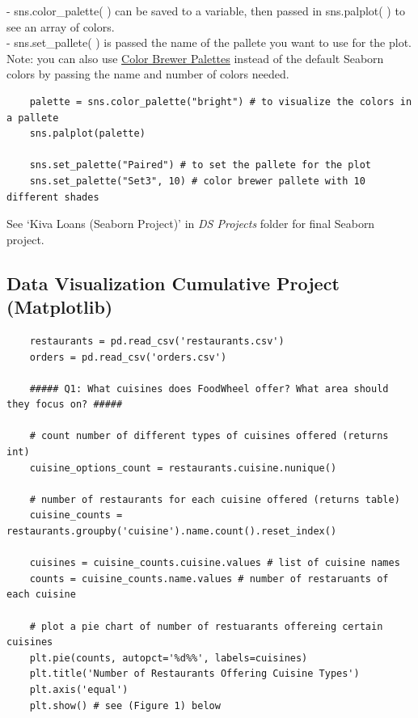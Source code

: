 \documentclass[11pt, a4paper]{article}
\begin{document}
\begin{spacing}{1.1}
	\hspace*{3mm} - sns.color\_palette( ) can be saved to a variable, then passed in sns.palplot( ) to see an array of colors. \\
	\hspace*{3mm} - sns.set\_pallete( ) is passed the name of the pallete you want to use for the plot. \vspace*{2mm} \\
	Note: you can also use \href{https://colorbrewer2.org/#type=sequential&scheme=BuGn&n=3}{Color Brewer Palettes} instead of the default Seaborn colors by passing the name and number of colors needed.
	\begin{lstlisting}
	palette = sns.color_palette("bright") # to visualize the colors in a pallete
	sns.palplot(palette) 
	
	sns.set_palette("Paired") # to set the pallete for the plot
	sns.set_palette("Set3", 10) # color brewer pallete with 10 different shades	\end{lstlisting} \vspace*{1mm}
	See `Kiva Loans (Seaborn Project)' in \textit{DS Projects} folder for final Seaborn project.\newpage

	\subsection{Data Visualization Cumulative Project (Matplotlib)}
	\begin{lstlisting}
	restaurants = pd.read_csv('restaurants.csv')
	orders = pd.read_csv('orders.csv')
	
	##### Q1: What cuisines does FoodWheel offer? What area should they focus on? #####
	
	# count number of different types of cuisines offered (returns int)
	cuisine_options_count = restaurants.cuisine.nunique()
	
	# number of restaurants for each cuisine offered (returns table)
	cuisine_counts = restaurants.groupby('cuisine').name.count().reset_index()
	
	cuisines = cuisine_counts.cuisine.values # list of cuisine names
	counts = cuisine_counts.name.values # number of restaruants of each cuisine
	
	# plot a pie chart of number of restuarants offereing certain cuisines 
	plt.pie(counts, autopct='%d%%', labels=cuisines)
	plt.title('Number of Restaurants Offering Cuisine Types')
	plt.axis('equal')
	plt.show() # see (Figure 1) below
	

\end{lstlisting}
\end{spacing}
\end{document}
